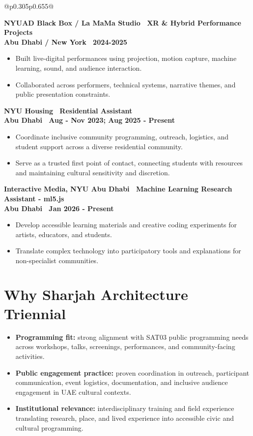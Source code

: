 \documentclass[letterpaper,10pt]{article}
\newcommand{\entrytitle}[1]{\textbf{\color{text}#1}}
\newcommand{\entrymeta}[1]{{\footnotesize\textcolor{muted}{\textbf{#1}}}}
\begin{document}
{\begin{tabular}{@{}p{0.305\textwidth}p{0.655\textwidth}@{}}
\begin{minipage}[t]{\linewidth}
  \entrytitle{NYUAD Black Box / La MaMa Studio \textbar\ XR \& Hybrid Performance Projects}\\
  \entrymeta{Abu Dhabi / New York \textbar\ 2024-2025}
  \begin{itemize}
    \item Built live-digital performances using projection, motion capture, machine learning, sound, and audience interaction.
    \item Collaborated across performers, technical systems, narrative themes, and public presentation constraints.
  \end{itemize}

  \entrytitle{NYU Housing \textbar\ Residential Assistant}\\
  \entrymeta{Abu Dhabi \textbar\ Aug - Nov 2023; Aug 2025 - Present}
  \begin{itemize}
    \item Coordinate inclusive community programming, outreach, logistics, and student support across a diverse residential community.
    \item Serve as a trusted first point of contact, connecting students with resources and maintaining cultural sensitivity and discretion.
  \end{itemize}

  \entrytitle{Interactive Media, NYU Abu Dhabi \textbar\ Machine Learning Research Assistant - ml5.js}\\
  \entrymeta{Abu Dhabi \textbar\ Jan 2026 - Present}
  \begin{itemize}
    \item Develop accessible learning materials and creative coding experiments for artists, educators, and students.
    \item Translate complex technology into participatory tools and explanations for non-specialist communities.
  \end{itemize}

  \section{Why Sharjah Architecture Triennial}
  \begin{itemize}
    \item \textbf{Programming fit:} strong alignment with SAT03 public programming needs across workshops, talks, screenings, performances, and community-facing activities.
    \item \textbf{Public engagement practice:} proven coordination in outreach, participant communication, event logistics, documentation, and inclusive audience engagement in UAE cultural contexts.
    \item \textbf{Institutional relevance:} interdisciplinary training and field experience translating research, place, and lived experience into accessible civic and cultural programming.
  \end{itemize}

  \end{minipage}

  \end{tabular}}

  
\end{document}
